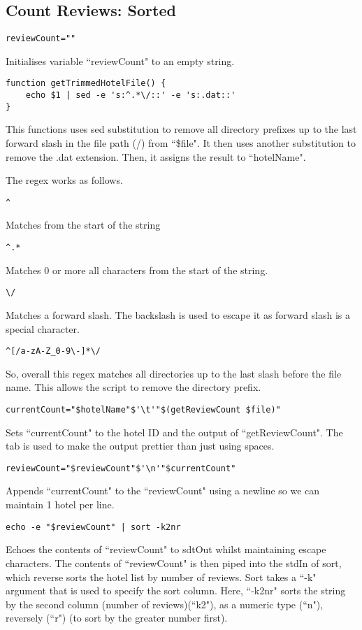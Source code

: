 \documentclass[a4paper]{article}
\begin{document}
%
\subsection{Count Reviews: Sorted}
\begin{lstlisting}
reviewCount=""
\end{lstlisting}
Initialises variable ``reviewCount" to an empty string.

\begin{lstlisting}
function getTrimmedHotelFile() {
	echo $1 | sed -e 's:^.*\/::' -e 's:.dat::'
}
\end{lstlisting}
This functions uses sed substitution to remove all directory prefixes up to the last forward slash in the file path (/) from ``\$file".
It then uses another substitution to remove the .dat extension.
Then, it assigns the result to ``hotelName".

The regex works as follows.
\begin{lstlisting}
^
\end{lstlisting}
Matches from the start of the string
\begin{lstlisting}
^.*
\end{lstlisting}
Matches 0 or more all characters from the start of the string.
\begin{lstlisting}
\/
\end{lstlisting}
Matches a forward slash. The backslash is used to escape it as forward slash is a special character.

\begin{lstlisting}
^[/a-zA-Z_0-9\-]*\/
\end{lstlisting}
So, overall this regex matches all directories up to the last slash before the file name.
This allows the script to remove the directory prefix.

\begin{lstlisting}
currentCount="$hotelName"$'\t'"$(getReviewCount $file)"
\end{lstlisting}
Sets ``currentCount" to the hotel ID and the output of ``getReviewCount".
The tab is used to make the output prettier than just using spaces.

\begin{lstlisting}
reviewCount="$reviewCount"$'\n'"$currentCount"
\end{lstlisting}
Appends ``currentCount" to the ``reviewCount" using a newline so we can maintain 1 hotel per line.

\begin{lstlisting}
echo -e "$reviewCount" | sort -k2nr
\end{lstlisting}
Echoes the contents of ``reviewCount" to sdtOut whilst maintaining escape characters.
The contents of ``reviewCount" is then piped into the stdIn of sort, which reverse sorts the hotel list by number of reviews.
Sort takes a ``-k" argument that is used to specify the sort column.
Here, ``-k2nr" sorts the string by the second column (number of reviews)(``k2"), as a numeric type (``n"), reversely (``r") (to sort by the greater number first).
\end{document}
